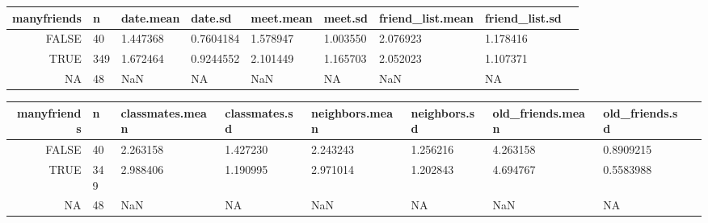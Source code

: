\documentclass[11pt]{article}
\begin{document}
    \begin{tabular}{r|llllllll}
 manyfriends & n & date.mean & date.sd & meet.mean & meet.sd & friend\_list.mean & friend\_list.sd\\
\hline
	 FALSE     &  40       & 1.447368  & 0.7604184 & 1.578947  & 1.003550  & 2.076923  & 1.178416 \\
	  TRUE     & 349       & 1.672464  & 0.9244552 & 2.101449  & 1.165703  & 2.052023  & 1.107371 \\
	    NA     &  48       &      NaN  &        NA &      NaN  &       NA  &      NaN  &       NA \\
\end{tabular}


    
    \begin{tabular}{r|llllllll}
 manyfriends & n & classmates.mean & classmates.sd & neighbors.mean & neighbors.sd & old\_friends.mean & old\_friends.sd\\
\hline
	 FALSE     &  40       & 2.263158  & 1.427230  & 2.243243  & 1.256216  & 4.263158  & 0.8909215\\
	  TRUE     & 349       & 2.988406  & 1.190995  & 2.971014  & 1.202843  & 4.694767  & 0.5583988\\
	    NA     &  48       &      NaN  &       NA  &      NaN  &       NA  &      NaN  &        NA\\
\end{tabular}
\end{document}
